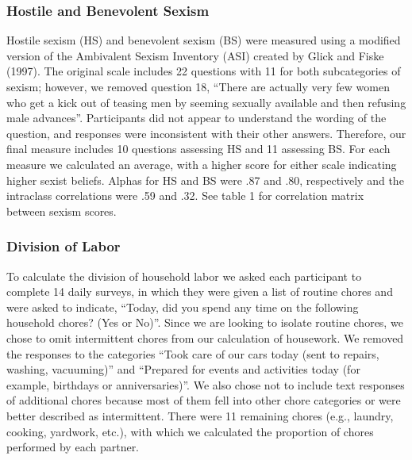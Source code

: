 \documentclass[
  english,
  man]{apa6}
\begin{document}
\hypertarget{hostile-and-benevolent-sexism}{%
\subsubsection{Hostile and Benevolent Sexism}\label{hostile-and-benevolent-sexism}}

Hostile sexism (HS) and benevolent sexism (BS) were measured using a modified version of the Ambivalent Sexism Inventory (ASI) created by Glick and Fiske (1997). The original scale includes 22 questions with 11 for both subcategories of sexism; however, we removed question 18, \enquote{There are actually very few women who get a kick out of teasing men by seeming sexually available and then refusing male advances}. Participants did not appear to understand the wording of the question, and responses were inconsistent with their other answers. Therefore, our final measure includes 10 questions assessing HS and 11 assessing BS. For each measure we calculated an average, with a higher score for either scale indicating higher sexist beliefs. Alphas for HS and BS were .87 and .80, respectively and the intraclass correlations were .59 and .32. See table 1 for correlation matrix between sexism scores.

\hypertarget{division-of-labor}{%
\subsubsection{Division of Labor}\label{division-of-labor}}

To calculate the division of household labor we asked each participant to complete 14 daily surveys, in which they were given a list of routine chores and were asked to indicate, \enquote{Today, did you spend any time on the following household chores? (Yes or No)}. Since we are looking to isolate routine chores, we chose to omit intermittent chores from our calculation of housework. We removed the responses to the categories \enquote{Took care of our cars today (sent to repairs, washing, vacuuming)} and \enquote{Prepared for events and activities today (for example, birthdays or anniversaries)}. We also chose not to include text responses of additional chores because most of them fell into other chore categories or were better described as intermittent. There were 11 remaining chores (e.g., laundry, cooking, yardwork, etc.), with which we calculated the proportion of chores performed by each partner.
\end{document}
